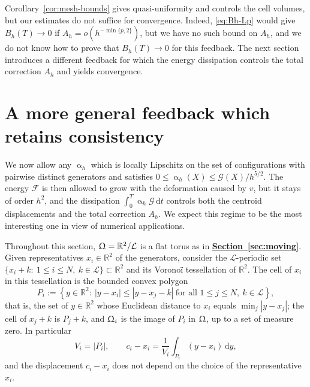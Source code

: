 \documentclass[letterpaper,11pt,twoside]{article}
\numberwithin{figure}{section}
\numberwithin{table}{section}
\theoremstyle{cpamplain}
\theoremstyle{cpamdefinition}
\newcommand{\R}{\mathbb{R}}
\newcommand{\diff}{\mathrm{d}}
\newcommand{\Secref}[1]{\textbf{\hyperref[#1]{Section~\ref*{#1}}}}
\let\alpha\upalpha
\let\Omega\Upomega
\renewcommand{\leq}{\leqslant}
\renewcommand{\le}{\leqslant}
\numberwithin{equation}{section}
\begin{document}
Corollary~\ref{cor:mesh-bounds} gives quasi-uniformity and controls the cell volumes, but our estimates do not suffice for convergence.
Indeed, \eqref{eq:Bh-Lp} would give $B_h(T)\to0$ if $A_h=o(h^{-\min\{p,2\}})$, but we have no such bound on $A_h$, and we do not know how to prove that $B_h(T)\to0$ for this feedback.
The next section introduces a different feedback for which the energy dissipation controls the total correction $A_h$ and yields convergence.

\section{A more general feedback which retains consistency}\label{subsec:adaptive-energy}

 
We now allow any $\alpha_h$ which is locally Lipschitz on the set of configurations with pairwise distinct generators and satisfies $0\leq \alpha_h(X)\leq \mathscr G(X)/h^{5/2}$.
The energy $\mathscr F$ is then allowed to grow with the deformation caused by $v$, but it stays of order $h^2$, and the dissipation $\int_0^T\alpha_h\mathscr G\,\diff t$ controls both the centroid displacements and the total correction $A_h$.
We expect this regime to be the most interesting one in view of numerical applications.

Throughout this section, $\Omega=\R^2/\mathcal L$ is a flat torus as in \Secref{sec:moving}.
Given representatives $x_i\in\R^2$ of the generators,  consider the $\mathcal L$-periodic set $\{x_i+k:\ 1\le i\le N,\ k\in\mathcal L\}\subset\R^2$ and its Vorono\"i tessellation of $\R^2$.
The cell of $x_i$ in this tessellation is the bounded convex polygon
\[
P_i:=\left\{y\in\R^2:\ |y-x_i|\le|y-x_j-k|\ \text{for all }1\le j\le N,\ k\in\mathcal L\right\},
\]
that is, the set of $y\in\R^2$ whose Euclidean distance to $x_i$ equals $\min_j|y-x_j|$; the cell of $x_j+k$ is $P_j+k$, and $\Omega_i$ is the image of $P_i$ in $\Omega$, up to a set of measure zero. In particular
\[
V_i=|P_i|,
\qquad c_i-x_i=\frac1{V_i}\int_{P_i}(y-x_i)\,\diff y,
\]
and the displacement $c_i-x_i$ does not depend on the choice of the representative $x_i$.
\end{document}
